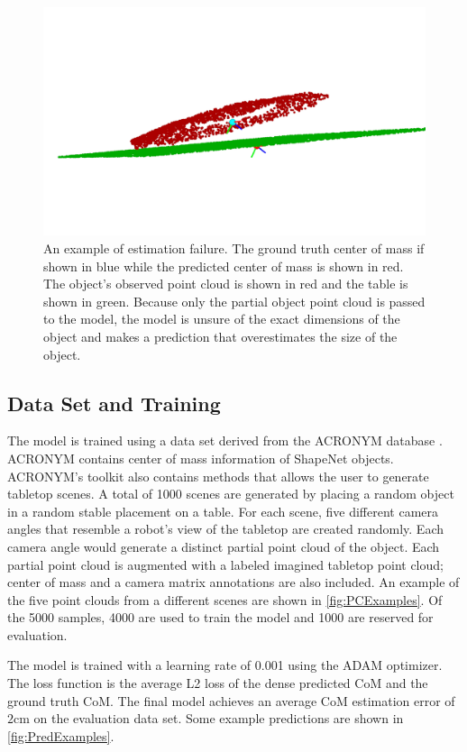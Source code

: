 \documentclass[12pt]{ucsddissertation}
\begin{document}
\begin{figure}
	\centering
	\includegraphics[width=0.6\linewidth]{figures/failExample.png}
	\caption[An example failure with unaugmented point cloud as input]{An example of estimation failure. The ground truth center of mass if shown in blue while the predicted center of mass is shown in red. The object's observed point cloud is shown in red and the table is shown in green. Because only the partial object point cloud is passed to the model, the model is unsure of the exact dimensions of the object and makes a prediction that overestimates the size of the object.}
	\label{fig:failExample}
\end{figure}

\subsection{Data Set and Training}
The model is trained using a data set derived from the ACRONYM database \cite{Eppner_Mousavian_Fox_2021}. ACRONYM contains center of mass information of ShapeNet \cite{chang2015shapenet} objects. ACRONYM's toolkit also contains methods that allows the user to generate tabletop scenes. A total of 1000 scenes are generated by placing a random object in a random stable placement on a table. For each scene, five different camera angles that resemble a robot's view of the tabletop are created randomly. Each camera angle would generate a distinct partial point cloud of the object. Each partial point cloud is augmented with a labeled imagined tabletop point cloud; center of mass and a camera matrix annotations are also included. An example of the five point clouds from a different scenes are shown in \ref{fig:PCExamples}. Of the 5000 samples, 4000 are used to train the model and 1000 are reserved for evaluation.

The model is trained with a learning rate of 0.001 using the ADAM optimizer. The loss function is the average L2 loss of the dense predicted CoM and the ground truth CoM. The final model achieves an average CoM estimation error of $2\mathrm{cm}$ on the evaluation data set. Some example predictions are shown in \ref{fig:PredExamples}.
\end{document}

